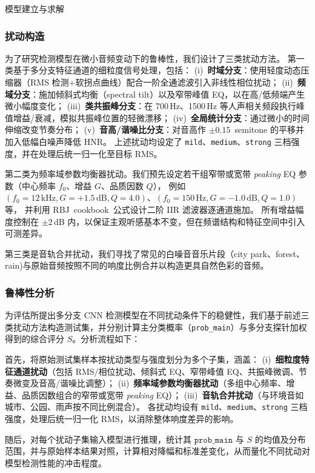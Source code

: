 \documentclass[aspectratio=169]{beamer}
\begin{document}
\begin{frame}{模型建立与求解}
\subsubsection{扰动构造}
为了研究检测模型在微小音频变动下的鲁棒性，我们设计了三类扰动方法。
第一类基于多分支特征通道的细粒度信号处理，包括：
(i)~\textbf{时域分支}：使用轻度动态压缩器（RMS 检测+软拐点曲线）配合一阶全通滤波引入非线性相位扰动；
(ii)~\textbf{频域分支}：施加倾斜式均衡（spectral tilt）以及窄带峰值 EQ，以在高/低频端产生微小幅度变化；
(iii)~\textbf{类共振峰分支}：在 700\,Hz、1500\,Hz 等人声相关频段执行峰值增益/衰减，模拟共振峰位置的轻微漂移；
(iv)~\textbf{全局统计分支}：通过微小的时间伸缩改变节奏分布；
(v)~\textbf{音高/谐噪比分支}：对音高作 $\pm 0.15$~semitone 的平移并加入低幅白噪声降低 HNR。
上述扰动均设定了 \texttt{mild}、\texttt{medium}、\texttt{strong} 三档强度，并在处理后统一归一化至目标 RMS。

第二类为频率域参数均衡器扰动。我们预先设定若干组窄带或宽带 \emph{peaking} EQ 参数（中心频率 $f_0$、增益 $G$、品质因数 $Q$），
例如 $(f_0=12\,\text{kHz}, G=+1.5\,\text{dB}, Q=4.0)$、$(f_0=150\,\text{Hz}, G=-1.0\,\text{dB}, Q=1.0)$ 等，
并利用 RBJ~cookbook~公式设计二阶 IIR 滤波器逐通道施加。
所有增益幅度控制在 $\pm 2$\,dB 内，以保证主观听感基本不变，但在频谱结构和特征空间中引入可测差异。


第三类是音轨合并扰动，我们寻找了常见的白噪音音乐片段（city park、forest、rain)与原始音频按照不同的响度比例合并以构造更具自然色彩的音频。



\subsubsection{鲁棒性分析}
为评估所提出多分支 CNN 检测模型在不同扰动条件下的稳健性，我们基于前述三类扰动方法构造测试集，并分别计算主分类概率（\texttt{prob\_main}）与多分支探针加权得到的综合评分 $S$。分析流程如下：

首先，将原始测试集样本按扰动类型与强度划分为多个子集，涵盖：
(i)~\textbf{细粒度特征通道扰动}（包括 RMS/相位扰动、倾斜式 EQ、窄带峰值 EQ、共振峰微调、节奏微变及音高/谐噪比调整）；
(ii)~\textbf{频率域参数均衡器扰动}（多组中心频率、增益、品质因数组合的窄带或宽带 \emph{peaking} EQ）；
(iii)~\textbf{音轨合并扰动}（与环境音如城市、公园、雨声按不同比例混合）。
各扰动均设有 \texttt{mild}、\texttt{medium}、\texttt{strong} 三档强度，处理后统一归一化 RMS，以消除整体响度差异的影响。

随后，对每个扰动子集输入模型进行推理，统计其 $\texttt{prob\_main}$ 与 $S$ 的均值及分布范围，并与原始样本结果对照，计算相对降幅和标准差变化，从而量化不同扰动对模型检测性能的冲击程度。


\end{frame}
\end{document}
